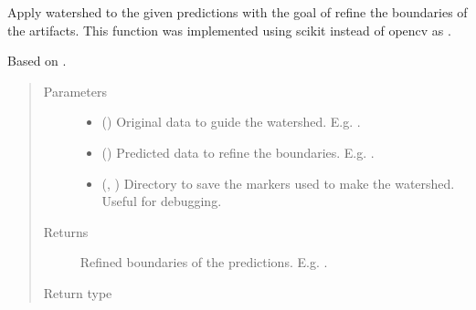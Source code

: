 \documentclass[letterpaper,10pt,english]{sphinxmanual}
\begin{document}

\begin{fulllineitems}
\label{\detokenize{data/post_processing/post_processing:data.post_processing.post_processing.boundary_refinement_watershed2}}
Apply watershed to the given predictions with the goal of refine the boundaries of the artifacts. This function
was implemented using scikit instead of opencv as .

Based on .
\begin{quote}\begin{description}
\item[{Parameters}] \leavevmode\begin{itemize}
\item {} 
 () \textendash{} Original data to guide the watershed. E.g. .

\item {} 
 () \textendash{} Predicted data to refine the boundaries. E.g. .

\item {} 
 (, ) \textendash{} Directory to save the markers used to make the watershed. Useful for debugging.

\end{itemize}

\item[{Returns}] \leavevmode
{} \textendash{} Refined boundaries of the predictions. E.g. .

\item[{Return type}] \leavevmode
{}

\end{description}\end{quote}

\end{fulllineitems}
\end{document}
